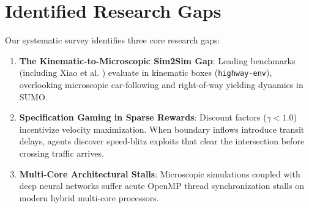 \vspace{-0.2cm}
\section{Identified Research Gaps}
Our systematic survey identifies three core research gaps:
\begin{enumerate}
    \setlength{\itemsep}{0pt}\setlength{\parskip}{0pt}
    \item \textbf{The Kinematic-to-Microscopic Sim2Sim Gap}: Leading benchmarks (including Xiao et al. \cite{xiao2024decision}) evaluate in kinematic boxes (\texttt{highway-env}), overlooking microscopic car-following and right-of-way yielding dynamics in SUMO.
    \item \textbf{Specification Gaming in Sparse Rewards}: Discount factors ($\gamma < 1.0$) incentivize velocity maximization. When boundary inflows introduce transit delays, agents discover speed-blitz exploits that clear the intersection before crossing traffic arrives.
    \item \textbf{Multi-Core Architectural Stalls}: Microscopic simulations coupled with deep neural networks suffer acute OpenMP thread synchronization stalls on modern hybrid multi-core processors.
\end{enumerate}

